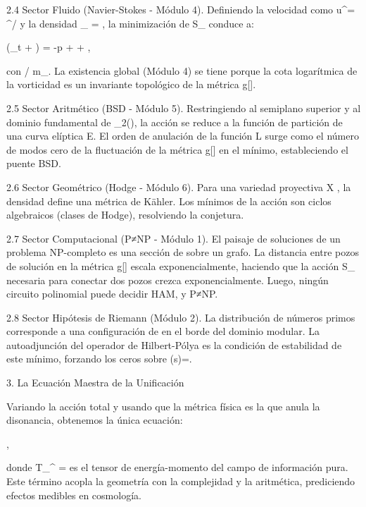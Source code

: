 \documentclass[12pt,a4paper]{book}
\begin{document}
2.4 Sector Fluido (Navier-Stokes - Módulo 4).
Definiendo la velocidad como u^\mu = \partial^\mu \phi / \sqrt{\partial_\alpha \phi \partial^\alpha \phi} y la densidad \rho_{} = \rho, la minimización de S_{} conduce a:

\rho (\partial_t  + \cdot\nabla {}) = -\nabla p + \nu \Delta {} + ,

con \nu \propto \hbar / m_{}. La existencia global (Módulo 4) se tiene porque la cota logarítmica de la vorticidad es un invariante topológico de la métrica g[\rho].

2.5 Sector Aritmético (BSD - Módulo 5).
Restringiendo  al semiplano superior y \rho al dominio fundamental de _2(), la acción se reduce a la función de partición de una curva elíptica E. El orden de anulación de la función L surge como el número de modos cero de la fluctuación de la métrica g[\rho] en el mínimo, estableciendo el puente BSD.

2.6 Sector Geométrico (Hodge - Módulo 6).
Para una variedad proyectiva X \subset {}, la densidad \rho define una métrica de Kähler. Los mínimos de la acción son ciclos algebraicos (clases de Hodge), resolviendo la conjetura.

2.7 Sector Computacional (P≠NP - Módulo 1).
El paisaje de soluciones de un problema NP-completo es una sección de \rho sobre un grafo. La distancia entre pozos de solución en la métrica g[\rho] escala exponencialmente, haciendo que la acción S_{} necesaria para conectar dos pozos crezca exponencialmente. Luego, ningún circuito polinomial puede decidir HAM, y P≠NP.

2.8 Sector Hipótesis de Riemann (Módulo 2).
La distribución de números primos corresponde a una configuración de \rho en el borde del dominio modular. La autoadjunción del operador de Hilbert-Pólya es la condición de estabilidad de este mínimo, forzando los ceros sobre \Re(s)=.

3. La Ecuación Maestra de la Unificación

Variando la acción total y usando que la métrica física es la que anula la disonancia, obtenemos la única ecuación:

,

donde \langle T_{\mu\nu}^{} \rangle =  es el tensor de energía-momento del campo de información pura. Este término acopla la geometría con la complejidad y la aritmética, prediciendo efectos medibles en cosmología.
\end{document}
